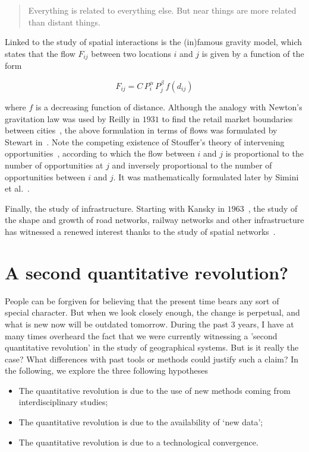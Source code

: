 \begin{quote}
    Everything is related to everything else. But near things
    are more related than distant things.
\end{quote}

Linked to the study of spatial interactions is the (in)famous gravity model,
which states that the flow $F_{ij}$ between two locations $i$ and $j$ is given
by a function of the form

\begin{equation}
    F_{ij} = C\, P_i^\alpha\,P_j^\beta\, f(d_{ij})
\end{equation}

where $f$ is a decreasing function of distance. Although the analogy with
Newton's gravitation law was used by Reilly in $1931$ to find the retail market
boundaries between cities~\cite{Reilly:1931}, the above formulation in terms of
flows was formulated by Stewart in~\cite{Stewart:1948}. Note the competing
existence of Stouffer's theory of intervening
opportunities~\cite{Stouffer:1940}, according to which the flow between $i$ and
$j$ is proportional to the number of opportunities at $j$ and inversely
proportional to the number of opportunities between $i$ and $j$. It was
mathematically formulated later by Simini et al.~\cite{Simini:2012}.

Finally, the study of infrastructure. Starting with Kansky in
$1963$~\cite{Kansky:1963}, the study of the shape and growth of road networks,
railway networks and other infrastructure has witnessed a renewed interest
thanks to the study of spatial networks~\cite{Barthelemy:2011}.


\section{A second quantitative revolution?}
\label{sec:a_second_quantitative_revolution_}

People can be forgiven for believing that the present time bears any sort of
special character. But when we look closely enough, the change is perpetual, and
what is new now will be outdated tomorrow. During the past $3$ years, I have
at many times overheard the fact that we were currently witnessing a 'second
quantitative revolution' in the study of geographical systems. But is it really
the case? What differences with past tools or methods could justify such a
claim? In the following, we explore the three following hypotheses

\begin{itemize}
    \item The quantitative revolution is due to the use of new methods coming
        from interdisciplinary studies;
    \item The quantitative revolution is due to the availability of `new data';
    \item The quantitative revolution is due to a technological convergence.      
\end{itemize}




